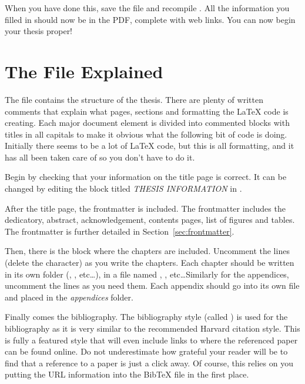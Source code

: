 When you have done this, save the file and recompile . All the information you filled in should now be in the PDF, complete with web links. You can now begin your thesis proper!


\section{The  File Explained}

The  file contains the structure of the thesis. There are plenty of written comments that explain what pages, sections and formatting the \LaTeX{} code is creating. Each major document element is divided into commented blocks with titles in all capitals to make it obvious what the following bit of code is doing. Initially there seems to be a lot of \LaTeX{} code, but this is all formatting, and it has all been taken care of so you don't have to do it.

Begin by checking that your information on the title page is correct. It can be changed by editing the block titled \emph{THESIS INFORMATION} in . 

After the title page, the frontmatter is included. The frontmatter includes the dedicatory, abstract, acknowledgement, contents pages, list of figures and tables. The frontmatter is further detailed in Section~\ref{sec:frontmatter}.

Then, there is the block where the chapters are included. Uncomment the lines (delete the \code{\%} character) as you write the chapters. Each chapter should be written in its own folder (, , etc\ldots), in a file named , , etc\ldots Similarly for the appendices, uncomment the lines as you need them. Each appendix should go into its own file and placed in the \emph{appendices} folder.

Finally comes the bibliography. The bibliography style (called ) is used for the bibliography as it is very similar to the recommended Harvard citation style. This is fully a featured style that will even include links to where the referenced paper can be found online. Do not underestimate how grateful your reader will be to find that a reference to a paper is just a click away. Of course, this relies on you putting the URL information into the BibTeX file in the first place.

